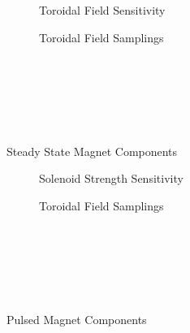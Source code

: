 \begin{figure}
    \centering
    \hfill 
    \begin{subfigure}[t]{0.42\textwidth}
        \centering
    \begin{adjustbox}{width=\textwidth}
      \Large
      
    \end{adjustbox}
        \caption{Toroidal Field Sensitivity}
    \end{subfigure}
    \hfill
    \begin{subfigure}[t]{0.48\textwidth}
        \centering
    \begin{adjustbox}{width=\textwidth}
      \Large
      
    \end{adjustbox}
        \caption{Toroidal Field Samplings}
    \end{subfigure}
    \hfill \hfill ~\\ ~\\ ~\\
    \caption{Steady State Magnet Components} ~\\
    \label{fig:charybdis}
\end{figure}

\begin{figure}
    \centering
    \hfill 
    \begin{subfigure}[t]{0.42\textwidth}
        \centering
    \begin{adjustbox}{width=\textwidth}
      \Large
      
    \end{adjustbox}
        \caption{Solenoid Strength Sensitivity}
    \end{subfigure}
    \hfill
    \begin{subfigure}[t]{0.48\textwidth}
        \centering
    \begin{adjustbox}{width=\textwidth}
      \Large
      
    \end{adjustbox}
        \caption{Toroidal Field Samplings}
    \end{subfigure}
    \hfill \hfill ~\\ ~\\ ~\\
    \caption{Pulsed Magnet Components} ~\\
    \label{fig:charybdis}
\end{figure}
